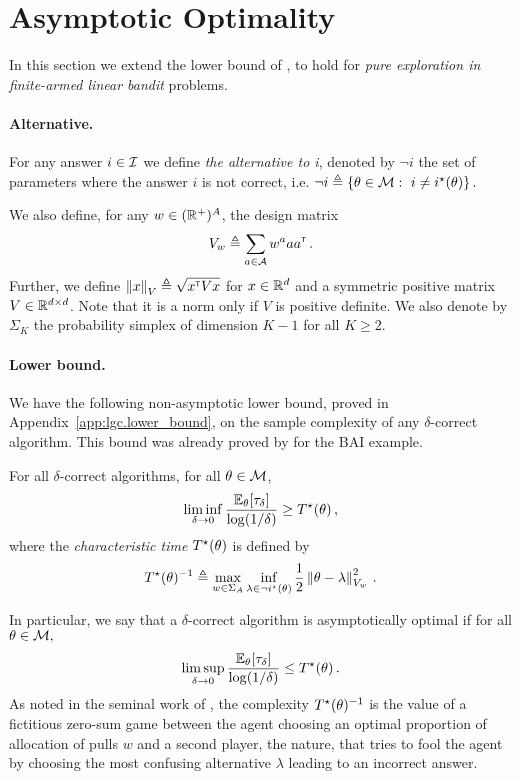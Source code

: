 \section{Asymptotic Optimality}\label{sec:lgc.lower_bound}

In this section we extend the lower bound of \citet{garivier2016tracknstop}, to hold for \emph{pure exploration in finite-armed linear bandit} problems.

\paragraph{Alternative.}
For any answer $i\in\mathcal{I}$ we define \emph{the alternative to i}, denoted by $\neg i$ the set of parameters where the answer $i$ is not correct, i.e.
$%
\neg i \eqdef \{\theta\in\cM:\ i\neq\istar(\theta)\}\,.
$%

We also define, for any $w\in(\mathbb{R}^+)^A$, the design matrix
\[V_w \triangleq \sum_{a\in \mathcal{A}} w^a a a^{\mathsf{\scriptscriptstyle T}}\,.\]
Further, we define $\left\lVert x\right\rVert_V\triangleq \sqrt{x^{\mathsf{\scriptscriptstyle T}} Vx}$ for $x\in\mathbb{R}^d$ and a symmetric positive matrix $V\in\mathbb{R}^{d\times d}$. Note that it is a norm only if $V$ is positive definite. We also denote by $\Sigma_K$ the probability simplex of dimension $K-1$ for all $K\ge 2$.

\paragraph{Lower bound.}
We have the following non-asymptotic lower bound, proved in Appendix~\ref{app:lgc.lower_bound}, on the sample complexity of any $\delta$-correct algorithm. This bound was already proved by \citet{soare2014linear} for the BAI example.
\begin{theorem}
\label{th:lb_genral}
For all $\delta$-correct algorithms, for all $\theta\in \mathcal{M}$,
\begin{equation*}
  \label{eq:lb_general}
  \liminf_{\delta\to 0}\frac{\mathbb{E}_\theta[\tau_{\delta}]}{\log(1/\delta)} \geq T^{\star}(\theta) \,,
\end{equation*}
where the \emph{characteristic time} $T^{\star}(\theta)$ is defined by
\[
T^{\star}(\theta)^{-1} \triangleq \max_{w \in \Sigma_A} \inf_{\lambda\in \neg i^\star(\theta)} \frac{1}{2}\left\lVert\theta - \lambda\right\rVert_{V_w}^2\,.
\]
\end{theorem}
In particular, we say that a $\delta$-correct algorithm is asymptotically optimal if for all $\theta\in\mathcal{M},$
\[
\limsup_{\delta\to 0}\frac{\mathbb{E}_\theta[\tau_{\delta}]}{\log(1/\delta)} \leq T^{\star}(\theta)\,.
\]
As noted in the seminal work of \citet{chernoff1959}, the complexity $T^{\star}(\theta)^{-1}$ is the value of a fictitious zero-sum game between the agent choosing an optimal proportion of allocation of pulls $w$ and a second player, the nature, that tries to fool the agent by choosing the most confusing alternative $\lambda$ leading to an incorrect answer.

